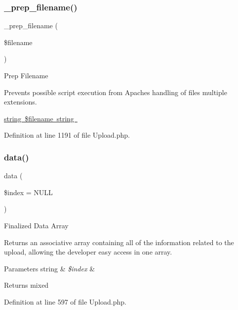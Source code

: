 \mbox{\label{class_c_i___upload_a00936ce870d818794909bf16dc2ff70b}} 
\subsubsection{\texorpdfstring{\_prep\_filename()}{\_prep\_filename()}}
{\footnotesize\ttfamily \+\_\+prep\+\_\+filename (\begin{DoxyParamCaption}\item[{}]{\$filename }\end{DoxyParamCaption})\hspace{0.3cm}{\ttfamily [protected]}}

Prep Filename

Prevents possible script execution from Apache\textquotesingle{}s handling of files\textquotesingle{} multiple extensions.

\mbox{\hyperlink{}{string \$filename  string }}

Definition at line 1191 of file Upload.\+php.

\mbox{\label{class_c_i___upload_afe56c7645362202d2f1c7b8f7da67f39}} 
\subsubsection{\texorpdfstring{data()}{data()}}
{\footnotesize\ttfamily data (\begin{DoxyParamCaption}\item[{}]{\$index = {\ttfamily NULL} }\end{DoxyParamCaption})}

Finalized Data Array

Returns an associative array containing all of the information related to the upload, allowing the developer easy access in one array.


\begin{DoxyParams}[1]{Parameters}
string & {\em \$index} & \\
\hline
\end{DoxyParams}
\begin{DoxyReturn}{Returns}
mixed 
\end{DoxyReturn}


Definition at line 597 of file Upload.\+php.

